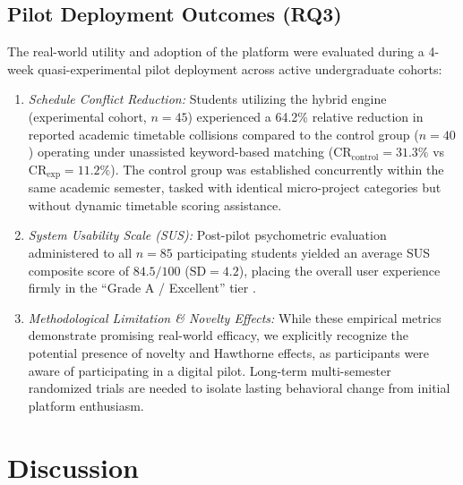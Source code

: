 \documentclass[a4paper,fleqn]{cas-dc}
\begin{document}
\subsection{Pilot Deployment Outcomes (RQ3)}
The real-world utility and adoption of the platform were evaluated during a 4-week quasi-experimental pilot deployment across active undergraduate cohorts:
\begin{enumerate}
    \item \textit{Schedule Conflict Reduction:} Students utilizing the hybrid engine (experimental cohort, $n = 45$) experienced a 64.2\% relative reduction in reported academic timetable collisions compared to the control group ($n = 40$) operating under unassisted keyword-based matching ($\text{CR}_{\text{control}} = 31.3\%$ vs $\text{CR}_{\text{exp}} = 11.2\%$). The control group was established concurrently within the same academic semester, tasked with identical micro-project categories but without dynamic timetable scoring assistance.
    \item \textit{System Usability Scale (SUS):} Post-pilot psychometric evaluation administered to all $n = 85$ participating students yielded an average SUS composite score of $84.5 / 100$ ($\text{SD} = 4.2$), placing the overall user experience firmly in the ``Grade A / Excellent'' tier \cite{bangor2008}.
    \item \textit{Methodological Limitation \& Novelty Effects:} While these empirical metrics demonstrate promising real-world efficacy, we explicitly recognize the potential presence of novelty and Hawthorne effects, as participants were aware of participating in a digital pilot. Long-term multi-semester randomized trials are needed to isolate lasting behavioral change from initial platform enthusiasm.
\end{enumerate}

\section{Discussion}
\label{sec:discussion}
\end{document}

